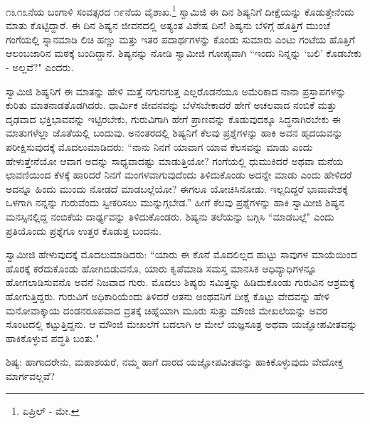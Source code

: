 ೧೩೧೩ನೆಯ ಬಂಗಾಳಿ ಸಂವತ್ಸರದ ೧೯ನೆಯ ವೈಶಾಖ.\footnote{ಏಪ್ರಿಲ್ - ಮೇ.} ಸ್ವಾಮಿಜಿ ಈ ದಿನ ಶಿಷ್ಯನಿಗೆ ದೀಕ್ಷೆಯನ್ನು ಕೊಡುತ್ತೇನೆಂದು ಮಾತು ಕೊಟ್ಟಿದ್ದಾರೆ. ಈ ದಿನ ಶಿಷ್ಯನ ಜೀವನದಲ್ಲಿ ಅತ್ಯಂತ ವಿಶೇಷ ದಿನ! ಶಿಷ್ಯನು ಬೆಳಿಗ್ಗೆ ಹೊತ್ತಿಗೆ ಮುಂಚೆ ಗಂಗೆಯಲ್ಲಿ ಸ್ನಾನಮಾಡಿ ಲಿಚಿ ಹಣ್ಣು ಮತ್ತು ಇತರ ಪದಾರ್ಥಗಳನ್ನು ಕೊಂಡು ಸುಮಾರು ಎಂಟು ಗಂಟೆಯ ಹೊತ್ತಿಗೆ ಆಲಂಬಜಾರಿನ ಮಠಕ್ಕೆ ಬಂದಿದ್ದಾನೆ. ಶಿಷ್ಯನನ್ನು ನೋಡಿ ಸ್ವಾಮೀಜಿ ಗೋಪ್ಯವಾಗಿ “ಇಂದು ನಿನ್ನನ್ನು ‘ಬಲಿ’ ಕೊಡಬೇಕು - ಅಲ್ಲವೆ?" ಎಂದರು.

ಸ್ವಾಮಿಜಿ ಶಿಷ್ಯನಿಗೆ ಈ ಮಾತನ್ನು ಹೇಳಿ ಮತ್ತೆ ನಗುನಗುತ್ತ ಎಲ್ಲರೊಡನೆಯೂ ಅಮೆರಿಕಾದ ನಾನಾ ಪ್ರಸ್ತಾಪಗಳನ್ನು ಕುರಿತು ಮಾತನಾಡತೊಡಗಿದರು. ಧಾರ್ಮಿಕ ಜೀವನವನ್ನು ಬೆಳೆಸಬೇಕಾದರೆ ಹೇಗೆ ಅಚಲವಾದ ನಂಬಿಕೆ ಮತ್ತು ದೃಢವಾದ ಭಕ್ತಿಭಾವವನ್ನು ಇಟ್ಟಿರಬೇಕು, ಗುರುವಿಗಾಗಿ ಹೇಗೆ ಪ್ರಾಣವನ್ನು ಕೊಡುವುದಕ್ಕೂ ಸಿದ್ಧನಾಗಿರಬೇಕು ಈ ಮಾತುಗಳೆಲ್ಲಾ ಜೊತೆಯಲ್ಲಿ ಬಂದುವು. ಅನಂತರದಲ್ಲಿ ಶಿಷ್ಯನಿಗೆ ಕೆಲವು ಪ್ರಶ್ನೆಗಳನ್ನು ಹಾಕಿ ಅವನ ಹೃದಯವನ್ನು ಪರೀಕ್ಷಿಸುವುದಕ್ಕೆ ಮೊದಲುಮಾಡಿದರು: “ನಾನು ನಿನಗೆ ಯಾವಾಗ ಯಾವ ಕೆಲಸವನ್ನು ಮಾಡು ಎಂದು ಹೇಳುತ್ತೇನೆಯೋ ಆವಾಗ ಅದನ್ನು ಸಾಧ್ಯವಾದಷ್ಟು ಮಾಡುತ್ತಿಯೋ? ಗಂಗೆಯಲ್ಲಿ ಧುಮುಕಿದರೆ ಅಥವಾ ಮನೆಯ ಛಾವಣಿಯಿಂದ ಕೆಳಕ್ಕೆ ಹಾರಿದರೆ ನಿನಗೆ ಮಂಗಳವಾಗುವುದೆಂದು ತಿಳಿದುಕೊಂಡು ಅದನ್ನೇ ಮಾಡು ಎಂದು ಹೇಳಿದರೆ ಅದನ್ನೂ ಹಿಂದು ಮುಂದು ನೋಡದೆ ಮಾಡಬಲ್ಲೆಯೋ? ಈಗಲೂ ಯೋಚಿಸಿನೋಡು. ಇಲ್ಲದಿದ್ದರೆ ಭಾವಾವೇಶಕ್ಕೆ ಒಳಗಾಗಿ ನನ್ನನ್ನು ಗುರುವೆಂದು ಸ್ವೀಕರಿಸಲು ಮುನ್ನುಗ್ಗಬೇಡ.” ಹೀಗೆ ಕೆಲವು ಪ್ರಶ್ನೆಗಳನ್ನು ಹಾಕಿ ಸ್ವಾಮೀಜಿ ಶಿಷ್ಯನ ಮನಸ್ಸಿನಲ್ಲಿದ್ದ ನಂಬಿಕೆಯ ದಾರ್ಢ್ಯವನ್ನು ತಿಳಿದುಕೊಂಡರು. ಶಿಷ್ಯನು ತಲೆಯನ್ನು ಬಗ್ಗಿಸಿ “ಮಾಡಬಲ್ಲೆ" ಎಂದು ಪ್ರತಿಯೊಂದು ಪ್ರಶ್ನೆಗೂ ಉತ್ತರ ಕೊಡುತ್ತ ಬಂದನು.

ಸ್ವಾಮೀಜಿ ಹೇಳುವುದಕ್ಕೆ ಮೊದಲುಮಾಡಿದರು: “ಯಾರು ಈ ಕೊನೆ ಮೊದಲಿಲ್ಲದ ಹುಟ್ಟು ಸಾವುಗಳ ಮಾಯೆಯಿಂದ ಹೊರಕ್ಕೆ ಕರೆದುಕೊಂಡು ಹೋಗಿಬಿಡುವನೊ, ಯಾರು ಕೃಪೆಮಾಡಿ ಸಮಸ್ತ ಮಾನಸಿಕ ಆಧಿವ್ಯಾಧಿಗಳನ್ನೂ ಹೋಗಲಾಡಿಸುವನೊ ಅವನೆ ನಿಜವಾದ ಗುರು. ಮೊದಲು ಶಿಷ್ಯರು ಸಮಿತ್ತನ್ನು ಹಿಡಿದುಕೊಂಡು ಗುರುವಿನ ಆಶ್ರಮಕ್ಕೆ ಹೋಗುತ್ತಿದ್ದರು. ಗುರುವಿಗೆ ಅಧಿಕಾರಿಯೆಂದು ತಿಳಿದರೆ ಆತನು ಅಂಥವನಿಗೆ ದೀಕ್ಷೆ ಕೊಟ್ಟು ವೇದವನ್ನು ಹೇಳಿ ಮನೋವಾಕ್ಕಾಯ ದಂಡನರೂಪವಾದ ವ್ರತಕ್ಕೆ ಚಿಹ್ನೆಯಾಗಿ ಮೂರು ಸುತ್ತು ಮೌಂಜಿ ಮೇಖಲೆಯನ್ನು ಅವರ ಸೊಂಟದಲ್ಲಿ ಕಟ್ಟುತ್ತಿದ್ದನು. ಆ ಮೌಂಜಿ ಮೇಖಲೆಗೆ ಬದಲಾಗಿ ಆ ಮೇಲೆ ಯಜ್ಞಸೂತ್ರ ಅಥವಾ ಯಜ್ಞೋಪವೀತವನ್ನು ಹಾಕಿಕೊಳ್ಳುವ ಪದ್ಧತಿ ಬಂತು."

ಶಿಷ್ಯ: ಹಾಗಾದರೇನು, ಮಹಾಶಯರೆ, ನಮ್ಮ ಹಾಗೆ ದಾರದ ಯಜ್ಞೋಪವೀತವನ್ನು ಹಾಕಿಕೊಳ್ಳುವುದು ವೇದೋಕ್ತ ಮಾರ್ಗವಲ್ಲವೆ?

